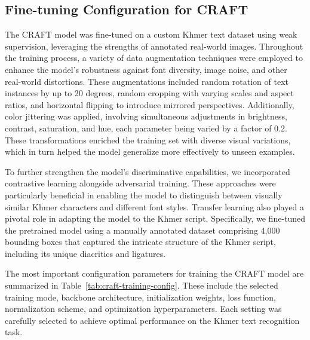 \subsection{Fine-tuning Configuration for CRAFT}
\label{subsec:craft-training}

The CRAFT model was fine-tuned on a custom Khmer text dataset 
using weak supervision, leveraging the strengths of annotated 
real-world images. Throughout the training process, a variety 
of data augmentation techniques were employed to enhance the 
model's robustness against font diversity, image noise, and 
other real-world distortions. These augmentations included random 
rotation of text instances by up to 20 degrees, random cropping 
with varying scales and aspect ratios, and horizontal flipping 
to introduce mirrored perspectives. Additionally, color jittering 
was applied, involving simultaneous adjustments in brightness, 
contrast, saturation, and hue, each parameter being varied by a 
factor of 0.2. These transformations enriched the training set 
with diverse visual variations, which in turn helped the model 
generalize more effectively to unseen examples.

To further strengthen the model’s discriminative capabilities, 
we incorporated contrastive learning alongside adversarial training. 
These approaches were particularly beneficial in enabling the model 
to distinguish between visually similar Khmer characters and 
different font styles. Transfer learning also played a pivotal 
role in adapting the model to the Khmer script. Specifically, 
we fine-tuned the pretrained model using a manually annotated 
dataset comprising 4,000 bounding boxes that captured the 
intricate structure of the Khmer script, including its unique 
diacritics and ligatures.

The most important configuration parameters for training the CRAFT 
model are summarized in Table~\ref{tab:craft-training-config}. 
These include the selected training mode, backbone architecture, 
initialization weights, loss function, normalization scheme, and 
optimization hyperparameters. Each setting was carefully selected 
to achieve optimal performance on the Khmer text recognition task.




